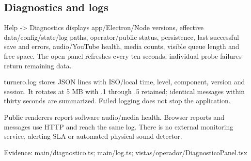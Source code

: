 \subsection{Diagnostics and logs}

Help -> Diagnostics displays app/Electron/Node versions, effective data/config/state/log paths, operator/public status, persistence, last successful save and errors, audio/YouTube health, media counts, visible queue length and free space. The open panel refreshes every ten seconds; individual probe failures return remaining data.

turnero.log stores JSON lines with ISO/local time, level, component, version and session. It rotates at 5 MB with .1 through .5 retained; identical messages within thirty seconds are summarized. Failed logging does not stop the application.

Public renderers report software audio/media health. Browser reports and messages use HTTP and reach the same log. There is no external monitoring service, alerting SLA or automated physical sound detector.

Evidence: main/diagnostico.ts; main/log.ts; vistas/operador/DiagnosticoPanel.tsx
